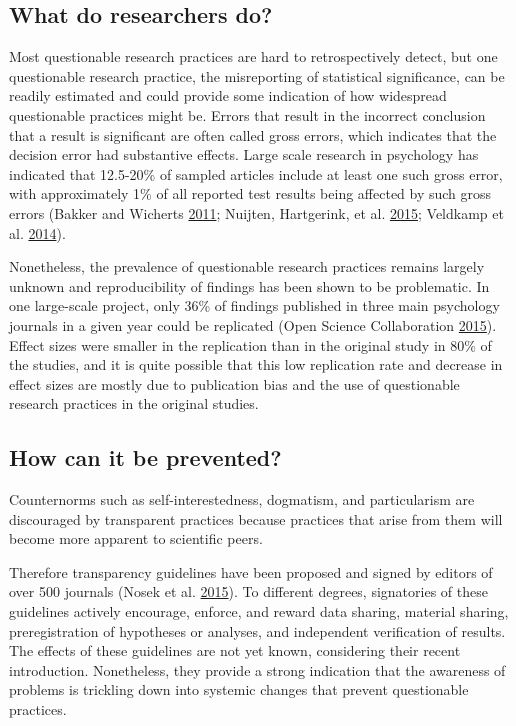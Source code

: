 \documentclass[a5paper]{book}
\begin{document}
\subsection{What do researchers do?}\label{what-do-researchers-do-1}

Most questionable research practices are hard to retrospectively detect,
but one questionable research practice, the misreporting of statistical
significance, can be readily estimated and could provide some indication
of how widespread questionable practices might be. Errors that result in
the incorrect conclusion that a result is significant are often called
gross errors, which indicates that the decision error had substantive
effects. Large scale research in psychology has indicated that 12.5-20\%
of sampled articles include at least one such gross error, with
approximately 1\% of all reported test results being affected by such
gross errors (Bakker and Wicherts
\protect\hyperlink{ref-doi:10.3758ux2fs13428-011-0089-5}{2011}; Nuijten,
Hartgerink, et al.
\protect\hyperlink{ref-doi:10.3758ux2fs13428-015-0664-2}{2015}; Veldkamp
et al.
\protect\hyperlink{ref-doi:10.1371ux2fjournal.pone.0114876}{2014}).

Nonetheless, the prevalence of questionable research practices remains
largely unknown and reproducibility of findings has been shown to be
problematic. In one large-scale project, only 36\% of findings published
in three main psychology journals in a given year could be replicated
(Open Science Collaboration
\protect\hyperlink{ref-doi:10.1126ux2fscience.aac4716}{2015}). Effect
sizes were smaller in the replication than in the original study in 80\%
of the studies, and it is quite possible that this low replication rate
and decrease in effect sizes are mostly due to publication bias and the
use of questionable research practices in the original studies.

\subsection{How can it be prevented?}\label{how-can-it-be-prevented}

Counternorms such as self-interestedness, dogmatism, and particularism
are discouraged by transparent practices because practices that arise
from them will become more apparent to scientific peers.

Therefore transparency guidelines have been proposed and signed by
editors of over 500 journals (Nosek et al.
\protect\hyperlink{ref-doi:10.1126ux2fscience.aab2374}{2015}). To
different degrees, signatories of these guidelines actively encourage,
enforce, and reward data sharing, material sharing, preregistration of
hypotheses or analyses, and independent verification of results. The
effects of these guidelines are not yet known, considering their recent
introduction. Nonetheless, they provide a strong indication that the
awareness of problems is trickling down into systemic changes that
prevent questionable practices.
\end{document}
